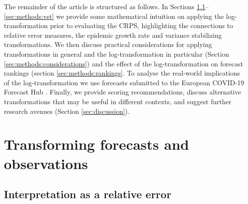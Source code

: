 \documentclass{article}
\begin{document}
The remainder of the article is structured as follows. In Sections \ref{sec:methods:relative}--\ref{sec:methods:vst} we provide some mathematical intuition on applying the log-transformation prior to evaluating the CRPS, highlighting the connections to relative error measures, the epidemic growth rate and variance stabilizing transformations.
We then discuss practical considerations for applying transformations in general and the log-transformation in particular (Section \ref{sec:methods:considerations}) and the effect of the log-transformation on forecast rankings (section \ref{sec:methods:rankings}. To analyse the real-world implications of the log-transformation we use forecasts submitted to the European COVID-19 Forecast Hub  \citep{europeancovid-19forecasthubEuropeanCovid19Forecast2021, sherrattPredictivePerformanceMultimodel2022}. Finally, we provide scoring recommendations, discuss alternative transformations that may be useful in different contexts, and suggest further research avenues (Section \ref{sec:discussion}). 


\section{Transforming forecasts and observations}
\label{sec:methods}

\subsection{Interpretation as a relative error}
\label{sec:methods:relative}
\end{document}
